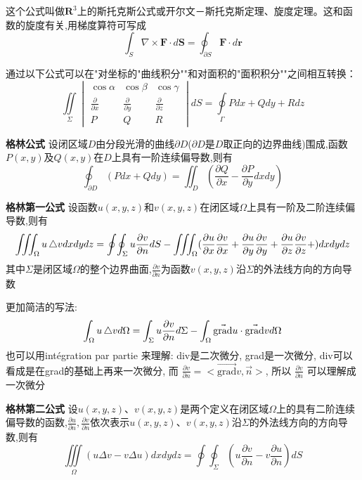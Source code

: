 \documentclass[openany]{book}
\begin{document}
这个公式叫做$\mathbf{R}^3$上的斯托克斯公式或开尔文－斯托克斯定理、旋度定理。这和函数的旋度有关,用梯度算符可写成
$$
 \int_{S} \nabla \times \mathbf{F} \cdot d\mathbf{S} = \oint_{\partial S} \mathbf{F} \cdot d \mathbf{r}
$$

通过以下公式可以在"对坐标的"曲线积分""和对面积的"面积积分""之间相互转换：
$$
\iint\limits_{\Sigma}\begin{vmatrix} \cos \alpha & \cos \beta & \cos \gamma \\ \frac{\partial}{\partial x} & \frac{\partial}{\partial y} & \frac{\partial}{\partial z} \\ P & Q & R \end{vmatrix}dS=\oint\limits_{\Gamma}Pdx+Qdy+Rdz
$$

\bigskip
\textbf{格林公式}
设闭区域$D$由分段光滑的曲线$\partial D$($\partial D$是$D$取正向的边界曲线)围成,函数$P(x,y)$及$Q(x,y)$在$D$上具有一阶连续偏导数,则有
$$\oint_{\partial D} (Pdx+Qdy) = \iint_D (\frac{\partial Q}{\partial x} - \frac{\partial  P}{\partial y}dxdy)$$

\bigskip
\textbf{格林第一公式}
设函数$u(x,y,z)$和$v(x,y,z)$在闭区域$\Omega$上具有一阶及二阶连续偏导数,则有
$$\iiint_{\Omega} u\mathop{}\!\mathbin\bigtriangleup v dxdydz
=
\oint\!\oint_{\Sigma} u \frac{\partial v}{\partial n}dS -
\iiint_{\Omega}(
\frac{\partial  u}{\partial x}\frac{\partial v}{\partial x}+
\frac{\partial  u}{\partial y}\frac{\partial v}{\partial y}+
\frac{\partial  u}{\partial z}\frac{\partial v}{\partial z}+
)dxdydz$$
其中$\Sigma$是闭区域$\Omega$的整个边界曲面,$\frac{\partial v}{\partial n}$为函数$v(x,y,z)$沿$\Sigma$的外法线方向的方向导数

更加简洁的写法:
$$
\int_{\Omega}u \mathop{}\!\mathbin\bigtriangleup v d\Omega = \int_{\Sigma}u \frac{\partial v}{\partial n}d\Sigma - \int_{\Omega} \vec{\mbox{grad}}u \cdot \vec{\mbox{grad}} v d\Omega
$$
也可以用int\'egration par partie 来理解:
div是二次微分, grad是一次微分, div可以看成是在grad的基础上再来一次微分, 而
$ \frac{\partial  v}{\partial n} = <\vec{\mbox{grad}} v,\vec{n}>$, 所以
$\frac{\partial  v}{\partial n}$ 可以理解成一次微分

\bigskip
\textbf{格林第二公式}
设$u(x,y,z)$、$v(x,y,z)$是两个定义在闭区域$\Omega$上的具有二阶连续偏导数的函数,$\frac{\partial u}{\partial n},\frac{\partial v}{\partial n}$依次表示$u(x,y,z)$、$v(x,y,z)$沿$\Sigma$的外法线方向的方向导数,则有
$$\iiint\limits_{\Omega}(u\Delta v - v\Delta u)dxdydz=\oint\!\oint_{\Sigma}(u \frac{\partial v}{\partial n}-v\frac{\partial u}{\partial n})dS$$
\end{document}
